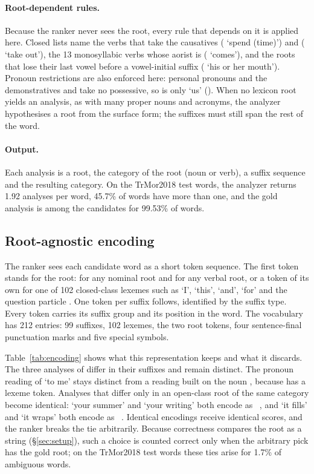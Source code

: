 \paragraph{Root-dependent rules.}
Because the ranker never sees the root, every rule that depends on it is applied here. Closed lists name the verbs that take the causatives  ( `spend (time)') and  ( `take out'), the 13 monosyllabic verbs whose aorist is  ( `comes'), and the roots that lose their last vowel before a vowel-initial suffix ( `his or her mouth'). Pronoun restrictions are also enforced here: personal pronouns and the demonstratives  and  take no possessive, so  is only `us' (). When no lexicon root yields an analysis, as with many proper nouns and acronyms, the analyzer hypothesises a root from the surface form; the suffixes must still span the rest of the word.

\paragraph{Output.}
Each analysis is a root, the category of the root (noun or verb), a suffix sequence and the resulting category. On the TrMor2018 test words, the analyzer returns 1.92 analyses per word, 45.7\% of words have more than one, and the gold analysis is among the candidates for 99.53\% of words.

\subsection{Root-agnostic encoding}
\label{sec:encoding}

The ranker sees each candidate word as a short token sequence. The first token stands for the root:  for any nominal root and  for any verbal root, or a token of its own for one of 102 closed-class lexemes such as  `I',  `this',  `and',  `for' and the question particle . One token per suffix follows, identified by the suffix type. Every token carries its suffix group and its position in the word. The vocabulary has 212 entries: 99 suffixes, 102 lexemes, the two root tokens, four sentence-final punctuation marks and five special symbols.

Table~\ref{tab:encoding} shows what this representation keeps and what it discards. The three analyses of  differ in their suffixes and remain distinct. The pronoun reading of  `to me' stays distinct from a reading built on the noun , because  has a lexeme token. Analyses that differ only in an open-class root of the same category become identical:  `your summer' and  `your writing' both encode as ~, and  `it fills' and  `it wraps' both encode as ~. Identical encodings receive identical scores, and the ranker breaks the tie arbitrarily. Because correctness compares the root as a string (\S\ref{sec:setup}), such a choice is counted correct only when the arbitrary pick has the gold root; on the TrMor2018 test words these ties arise for 1.7\% of ambiguous words.

